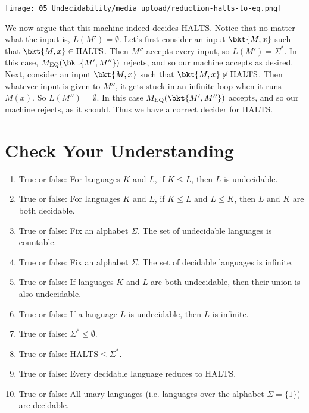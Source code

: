 \begin{flex}
\begin{solution}
\begin{center}
\texttt{[image: 05\_Undecidability/media\_upload/reduction-halts-to-eq.png]}
\end{center}

We now argue that this machine indeed decides $\text{HALTS}$. Notice that no matter what the input is, $L(M') = \emptyset$. Let's first consider an input $\bkt{M,x}$ such that $\bkt{M,x} \in \text{HALTS}$. Then $M''$ accepts every input, so $L(M') = \Sigma^*$. In this case, $M_\text{EQ}(\bkt{M',M''})$ rejects, and so our machine accepts as desired. Next, consider an input $\bkt{M,x}$ such that $\bkt{M,x} \not \in \text{HALTS}$. Then whatever input is given to $M''$, it gets stuck in an infinite loop when it runs $M(x)$. So $L(M'')= \emptyset$. In this case $M_\text{EQ}(\bkt{M',M''})$ accepts, and so our machine rejects, as it should. Thus we have a correct decider for $\text{HALTS}$.

\end{solution}
\end{flex}


\section{Check Your Understanding}
\label{sec:Undecidable-Languages::check-your-understanding}

\begin{gram}
\label{grm:Undecidable-Languages::true}
\begin{enumerate}
    \item True or false: For languages $K$ and $L$, if $K \leq L$, then $L$ is undecidable.
    \item True or false: For languages $K$ and $L$, if $K \leq L$ and $L \leq K$, then $L$ and $K$ are both decidable.
    \item True or false: Fix an alphabet $\Sigma$. The set of undecidable languages is countable.
    \item True or false: Fix an alphabet $\Sigma$. The set of decidable languages is infinite.
    \item True or false: If languages $K$ and $L$ are both undecidable, then their union is also undecidable.
    \item True or false: If a language $L$ is undecidable, then $L$ is infinite.
    \item True or false: $\Sigma^* \leq \emptyset$.
    \item True or false: $\text{HALTS} \leq \Sigma^*$.
    \item True or false: Every decidable language reduces to $\text{HALTS}$. 
    \item True or false: All unary languages (i.e. languages over the alphabet $\Sigma = \{1\}$) are decidable.
\end{enumerate}

\end{gram}


